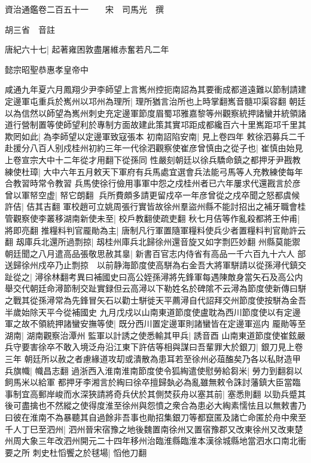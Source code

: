 資治通鑑卷二百五十一　　宋　司馬光　撰

胡三省　音註

唐紀六十七|{
	起著雍困敦盡屠維赤奮若凡二年}


懿宗昭聖恭惠孝皇帝中

咸通九年夏六月鳳翔少尹李師望上言嶲州控扼南詔為其要衝成都道遠難以節制請建定邊軍屯重兵於嶲州以邛州為理所|{
	理所猶言治所也上時掌翻嶲音髓卭渠容翻}
朝廷以為信然以師望為嶲州刺史充定邊軍節度眉蜀邛雅嘉黎等州觀察統押諸蠻并統領諸道行營制置等使師望利於專制方面故建此策其實邛距成都纔百六十里嶲距邛千里其欺罔如此|{
	為李師望以定邊軍致寇張本}
初南詔陷安南|{
	見上卷四年}
敕徐泗募兵二千赴援分八百人别戍桂州初約三年一代徐泗觀察使崔彦曾慎由之從子也|{
	崔慎由始見上卷宣宗大中十二年從才用翻下從孫同}
性嚴刻朝廷以徐兵驕命鎮之都押牙尹戡教練使杜璋|{
	大中六年五月敕天下軍府有兵馬處宜選會兵法能弓馬等人充教練使每年合教習時常令教習}
兵馬使徐行儉用事軍中怨之戍桂州者已六年屢求代還戡言於彦曾以軍帑空虚|{
	帑它朗翻}
兵所費頗多請更留戍卒一年彦曾從之戍卒聞之怒都虞候許佶|{
	佶其吉翻}
軍校趙可立姚周張行實皆故徐州羣盜州縣不能討招出之補牙職會桂管觀察使李叢移湖南新使未至|{
	校戶教翻使疏吏翻}
秋七月佶等作亂殺都將王仲甫|{
	將即亮翻}
推糧料判官龎勛為主|{
	唐制凡行軍置隨軍糧料使兵少者置糧料判官勛許云翻}
刼庫兵北還所過剽掠|{
	刼桂州庫兵北歸徐州還音旋又如字剽匹妙翻}
州縣莫能禦朝廷聞之八月遣高品張敬思赦其辠|{
	新書百官志内侍省有高品一千六百九十六人}
部送歸徐州戍卒乃止剽掠　以前静海節度使高駢為右金吾大將軍駢請以從孫潯代鎮交趾從之|{
	潯徐林翻考異曰補國史曰高公姪孫潯將先鋒軍每遇陳敵身當矢石及高公内舉交代朝廷命潯節制交趾實録但云高潯以下勒姓名於碑隂不云潯為節度使新傳曰駢之戰其從孫潯常為先鋒冒矢石以勸士駢徙天平薦潯自代詔拜交州節度使按駢為金吾半歲始除天平今從補國史}
九月戊戍以山南東道節度使盧耽為西川節度使以有定邊軍之故不領統押諸蠻安撫等使|{
	既分西川置定邊軍則諸蠻皆在定邊軍巡内}
龎勛等至湖南|{
	湖南觀察治潭州}
監軍以計誘之使悉輸其甲兵|{
	誘音酉}
山南東道節度使崔鉉嚴兵守要害徐卒不敢入境泛舟沿江東下許佶等相與謀曰吾輩罪大於銀刀|{
	銀刀見上卷三年}
朝廷所以赦之者慮緣道攻刧或潰散為患耳若至徐州必葅醢矣乃各以私財造甲兵旗幟|{
	幟昌志翻}
過浙西入淮南淮南節度使令狐綯遣使慰勞給芻米|{
	勞力到翻芻以飼馬米以給軍}
都押牙李湘言於綯曰徐卒擅歸埶必為亂雖無敕令誅討藩鎮大臣當臨事制宜高郵岸峻而水深狹請將奇兵伏於其側焚荻舟以塞其前|{
	塞悉則翻}
以勁兵蹙其後可盡擒也不然縱之使得度淮至徐州與怨憤之衆合為患必大綯素懦怯且以無敕書乃曰彼在淮南不為暴聽其自過餘非吾事也勛招集銀刀等都竄匿及諸亡命匿於舟中衆至千人丁巳至泗州|{
	泗州晉宋宿豫之地後魏置南徐州又置宿豫郡又改東徐州又改東楚州周大象三年改泗州開元二十四年移州治臨淮縣臨淮本漢徐城縣地當泗水口南北衝要之所}
刺史杜慆饗之於毬場|{
	慆他刀翻}
